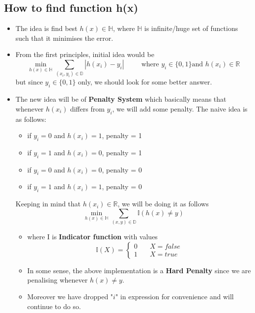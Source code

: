 \documentclass[11pt, twosides]{article}
\begin{document}
\subsection{How to find function h(x)}
\begin{itemize}
    \item The idea is find best $h(x) \in \mathbb{H}$, where $\mathbb{H}$ is infinite/huge set of functions such that it minimises the error.
    \item From the first principles, initial idea would be $$\min_{h(x)\in \mathbb{H}} \sum_{(x_{i},y_{i})\in \mathbb{D}}{|h(x_{i})-y_{i}|} \hspace{30pt}\text{where } y_{i} \in \{0,1\} \text{and } h(x_{i}) \in \mathbb{R}$$
    but since $y_{i} \in \{0,1\}$ only, we should look for some better answer.
    \item The new idea will be of \textbf{Penalty System} which basically means that whenever $h(x_{i})$ differs from $y_{i}$, we will add some penalty.
    The naive idea is as follows:
    \begin{itemize}
        \item if $y_{i}=0$ and $h(x_{i})= 1$, penalty = 1
        \item if $y_{i}=1$ and $h(x_{i})= 0$, penalty = 1
        \item if $y_{i}=0$ and $h(x_{i})= 0$, penalty = 0
        \item if $y_{i}=1$ and $h(x_{i})= 1$, penalty = 0
     \end{itemize}
     Keeping in mind that $h(x_{i}) \in \mathbb{R}$, we will be doing it as follows
     $$\min_{h(x)\in \mathbb{H}} \sum_{(x,y)\in \mathbb{D}}{\mathbb{I}(h(x)\ne y)}$$
    \begin{itemize}
        \item where I is \textbf{Indicator function} with values
            \begin{equation*}
    \mathbb{I}(X) =\left\{
            \begin{array}{ll}
            0 & \quad X=false\\
            1 & \quad X=true
            \end{array}
        \right.
   \end{equation*}
         \item In some sense, the above implementation is a \textbf{Hard Penalty} since we are penalising whenever $h(x)\ne y$.
     \item Moreover we have dropped "$i$" in expression for convenience and will continue to do so.

\end{itemize}
\end{itemize}
\end{document}
